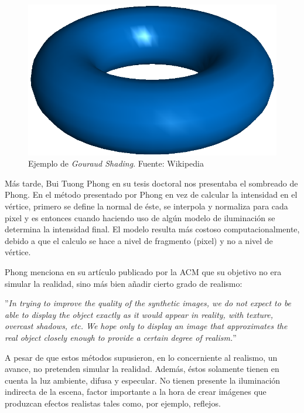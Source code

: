 \documentclass[titlepage,12pt]{report}
\begin{document}
\begin{figure}[ht]
	\centering
	\includegraphics[scale=0.25]{media/Gouraudshading00.png}
	\caption{Ejemplo de \textit{Gouraud Shading}. Fuente: Wikipedia}
	\label{Gouraud:shading}
\end{figure}

Más tarde, Bui Tuong Phong en su tesis doctoral \cite{Phong1975} nos presentaba el sombreado de Phong. En el método presentado por Phong en vez de calcular la intensidad en el vértice, primero se define la normal de éste, se interpola y normaliza para cada pixel y es entonces cuando haciendo uso de algún modelo de iluminación se determina la intensidad final. El modelo resulta más costoso computacionalmente, debido a que el calculo se hace a nivel de fragmento (pixel) y no a nivel de vértice.

Phong menciona en su artículo publicado por la ACM \cite[p.~311]{Phong1975} que su objetivo no era simular la realidad, sino más bien añadir cierto grado de realismo:

\begin{mdframed}[hidealllines=true,backgroundcolor=gray!20]
''\textit{In trying to improve the quality of the synthetic images, we do not expect to be able to display the object exactly as it would appear in reality, with texture, overcast shadows, etc. We hope only to display an image that approximates the real object closely enough to provide a certain degree of realism.}'' 
\end{mdframed}

A pesar de que estos métodos supusieron, en lo concerniente al realismo, un avance, no pretenden simular la realidad. Además, éstos solamente tienen en cuenta la luz ambiente, difusa y especular. No tienen presente la iluminación indirecta de la escena, factor importante a la hora de crear imágenes que produzcan efectos realistas tales como, por ejemplo, reflejos.
\end{document}
